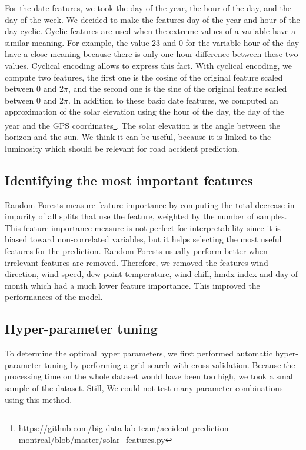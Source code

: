 \documentclass[conference]{IEEEtran}
\begin{document}
For the date features, we took the day of the year, the hour of the day,
and the day of the week. We decided to make the features day of the year
and hour of the day cyclic. Cyclic features are used when the extreme values
of a variable have a similar meaning. For example, the value 23 and 0 for
the variable hour of the day have a close meaning because there is only one
hour difference between these two values. Cyclical encoding allows to express
this fact. With cyclical encoding, we compute two features, the first one is
the cosine of the original feature scaled between 0 and 2$\pi$, and the second
one is the sine of the original feature scaled between 0 and 2$\pi$.
In addition to these basic date features, we computed an approximation
of the solar elevation using the hour of the day, the day of the year
and the GPS coordinates\footnote{\url{https://github.com/big-data-lab-team/accident-prediction-montreal/blob/master/solar\_features.py}}. The solar elevation is the angle 
between the horizon and the sun. We think it can be useful, because it is
linked to the luminosity which should be relevant for road accident prediction.

\subsection{Identifying the most important features}

Random Forests measure feature importance by computing the total
decrease in impurity of all splits that use the feature, weighted by the
number of samples. This feature importance measure is not perfect for
interpretability since it is biased toward non-correlated variables, but it
helps selecting the most useful features for the prediction. 
Random Forests usually perform better when irrelevant features are removed.
Therefore, we removed the features wind direction, wind speed, dew
point temperature, wind chill, hmdx index and day of month which had a
much lower feature importance. This improved the performances of the model.

\subsection{Hyper-parameter tuning}

To determine the optimal hyper parameters, we first performed
automatic hyper-parameter tuning by performing a grid search 
with cross-validation. Because the processing time on the whole dataset would
have been too high, we took a small sample of the dataset. Still, We could
not test many parameter combinations using this method.
\end{document}

